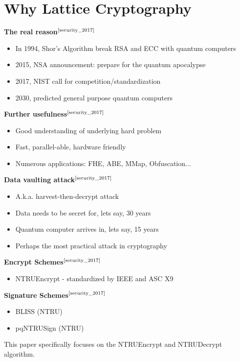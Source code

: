 \documentclass[cryptography,article,submit,moreauthors,pdftex]{Definitions/mdpi}
\begin{document}
\section{Why Lattice Cryptography}
\begin{flushleft}
\textbf{The real reason}$^{\text{\cite{security_2017}}}$
\begin{itemize}
    \item In 1994, Shor's Algorithm break RSA and ECC with quantum computers
    \item 2015, NSA announcement: prepare for the quantum apocalypse
    \item 2017, NIST call for competition/standardization
    \item 2030, predicted general purpose quantum computers
\end{itemize}

\textbf{Further usefulness}$^{\text{\cite{security_2017}}}$
\begin{itemize}
    \item Good understanding of underlying hard problem
    \item Fast, parallel-able, hardware friendly
    \item Numerous applications: FHE, ABE, MMap, Obfuscation...
\end{itemize}

\textbf{Data vaulting attack}$^{\text{\cite{security_2017}}}$
\begin{itemize}
    \item A.k.a. harvest-then-decrypt attack
    \item Data needs to be secret for, lets say, 30 years
    \item Quantum computer arrives in, lets say, 15 years
    \item Perhaps the most practical attack in cryptography
\end{itemize}

\newpage
\textbf{Encrypt Schemes}$^{\text{\cite{security_2017}}}$
\begin{itemize}
    \item NTRUEncrypt - standardized by IEEE and ASC X9
\end{itemize}

\textbf{Signature Schemes}$^{\text{\cite{security_2017}}}$
\begin{itemize}
    \item BLISS (NTRU)
    \item pqNTRUSign (NTRU)
\end{itemize}

This paper specifically focuses on the NTRUEncrypt and NTRUDecrypt algorithm.
\end{flushleft}
\end{document}
